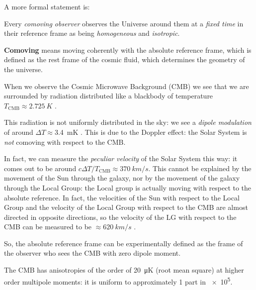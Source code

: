 \documentclass[main.tex]{subfiles}
\begin{document}
A more formal statement is:
%
\begin{proposition}
    Every \emph{comoving observer} observes the Universe around them at a \emph{fixed time} in their reference frame as being \emph{homogeneous} and \emph{isotropic}.
\end{proposition}

\textbf{Comoving} means moving coherently with the absolute reference frame, which is defined as the rest frame of the cosmic fluid, which determines the geometry of the universe. 

When we observe the Cosmic Microwave Background (CMB) we see that we are surrounded by radiation distributed like a blackbody of temperature \(T _{\text{CMB}} \approx \SI{2.725}{K}\) \cite[]{Fixsen:2009}.

This radiation is not uniformly distributed in the sky: we 
see a \emph{dipole modulation} of around \(\Delta T \approx\)\SI{3.4}{mK} \cite[]{PlanckCollaboration:2018I}.
This is due to the Doppler effect: the Solar System is \emph{not} comoving with respect to the CMB.

In fact, we can measure the \emph{peculiar velocity} of the Solar System this way: it comes out to be around \(c \Delta T / T _{\text{CMB}} \approx \SI{370}{km/s}\).
This cannot be explained by the movement of the Sun through the galaxy, nor by the movement of the galaxy through the Local Group: the Local group is actually moving with respect to the absolute reference.
In fact, the velocities of the Sun with respect to the Local Group and the velocity of the Local Group with respect to the CMB are almost directed in opposite directions, so the velocity of the LG with respect to the CMB can be measured to be \(\approx \SI{620}{km/s}\) \cite[Table 3]{PlanckCollaboration:2018I}.

So, the absolute reference frame can be experimentally defined as the frame of the observer who sees the CMB with zero dipole moment.

The CMB has anisotropies of the order of \SI{20}{\micro K} (root mean square) \cite[]{Wright:2003} at higher order multipole moments: it is uniform to approximately 1 part in \num{e5}.


\end{document}
